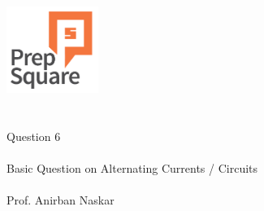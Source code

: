 \documentclass{beamer}
\begin{document}
\begin{center}
\ \\ \ \\
\includegraphics[width=30mm]{Logo-final.png} \\
\ \\ \ \\ 
{\huge Question 6 \\ \ \\ }
{\Large
Basic Question on Alternating Currents / Circuits
}
{\large \ \\ \ \\ Prof. Anirban Naskar }
\end{center}
\end{document}
